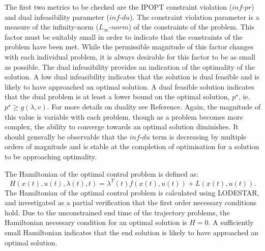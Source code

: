 The first two metrics to be checked are the IPOPT constraint violation ($inf\textrm{-}pr$) and dual infeasibility parameter ($inf\textrm{-}du$)\cite{Kawajir2010}. The constraint violation parameter is a measure of the infinity-norm ($L_\infty\textrm{-}norm$) of the constraints of the problem\cite{Kawajir2010}. This factor must be suitably small in order to indicate that the constraints of the problem have been met. While the permissible magnitude of this factor changes with each individual problem, it is always desirable for this factor to be as small as possible. The dual infeasibility provides an indication of the optimality of the solution. A low dual infeasibility indicates that the solution is dual feasible and is likely to have approached an optimal solution. A dual feasible solution indicates that the dual problem is at least a lower bound on the optimal solution, $p^\star$, ie. $p^\star \geq g(\lambda,v)$. For more details on duality see Reference\cite{Hindi2006}.
 Again, the magnitude of this value is variable with each problem, though as a problem becomes more complex, the ability to converge towards an optimal solution diminishes. It should generally be observable that the $inf\textrm{-}du$ term is decreasing by multiple orders of magnitude and is stable at the completion of optimisation for a solution to be approaching optimality. 

The Hamiltonian of the optimal control problem is defined as:
\begin{equation}
H(x(t),u(t),\lambda(t),t) = \lambda^T(t)f(x(t),u(t)) + L(x(t),u(t)).
\end{equation}
The Hamiltonian of the optimal control problem is calculated using LODESTAR, and investigated as a partial verification that the first order necessary conditions hold. Due to the unconstrained end time of the trajectory problems, the Hamiltonian necessary condition for an optimal solution is $H = 0 $\cite{Pucci2007}. 
 A sufficiently small Hamiltonian indicates that the end solution is likely to have approached an optimal solution.


